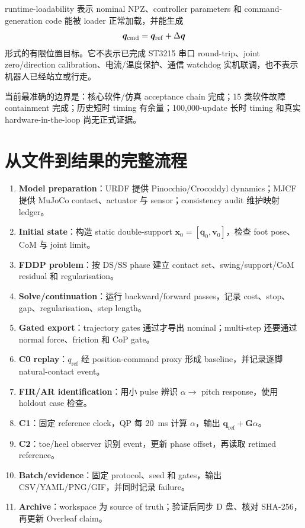 \documentclass[UTF8,11pt,a4paper]{ctexart}
\begin{document}
runtime-loadability 表示 nominal NPZ、controller parameters 和 command-generation code 能被 loader 正常加载，并能生成
\begin{equation}
 \bm q_{\rm cmd}=\bm q_{\rm ref}+\Delta\bm q
\end{equation}
形式的有限位置目标。它不表示已完成 ST3215 串口 round-trip、joint zero/direction calibration、电流/温度保护、通信 watchdog 实机联调，也不表示机器人已经站立或行走。

\begin{warningbox}
当前最准确的边界是：核心软件/仿真 acceptance chain 完成；15 类软件故障 containment 完成；历史短时 timing 有余量；100,000-update 长时 timing 和真实 hardware-in-the-loop 尚无正式证据。
\end{warningbox}

\section{从文件到结果的完整流程}\label{sec:pipeline}

\begin{enumerate}[label=\textbf{Step \arabic*:}]
 \item \textbf{Model preparation}：URDF 提供 Pinocchio/Crocoddyl dynamics；MJCF 提供 MuJoCo contact、actuator 与 sensor；consistency audit 维护映射 ledger。
 \item \textbf{Initial state}：构造 static double-support $\bm x_0=[\bm q_0,\bm v_0]$，检查 foot pose、CoM 与 joint limit。
 \item \textbf{FDDP problem}：按 DS/SS phase 建立 contact set、swing/support/CoM residual 和 regularisation。
 \item \textbf{Solve/continuation}：运行 backward/forward passes，记录 cost、stop、gap、regularisation、step length。
 \item \textbf{Gated export}：trajectory gates 通过才导出 nominal；multi-step 还要通过 normal force、friction 和 CoP gate。
 \item \textbf{C0 replay}：$q_{\mathrm{ref}}$ 经 position-command proxy 形成 baseline，并记录逐脚 natural-contact event。
 \item \textbf{FIR/AR identification}：用小 pulse 辨识 $\alpha\rightarrow$ pitch response，使用 holdout case 检查。
 \item \textbf{C1}：固定 reference clock，QP 每 \SI{20}{ms} 计算 $\alpha$，输出 $\bm q_{\mathrm{ref}}+\bm G\alpha$。
 \item \textbf{C2}：toe/heel observer 识别 event，更新 phase offset，再读取 retimed reference。
 \item \textbf{Batch/evidence}：固定 protocol、seed 和 gates，输出 CSV/YAML/PNG/GIF，并同时记录 failure。
 \item \textbf{Archive}：workspace 为 source of truth；验证后同步 D 盘、核对 SHA-256，再更新 Overleaf claim。
\end{enumerate}
\end{document}

